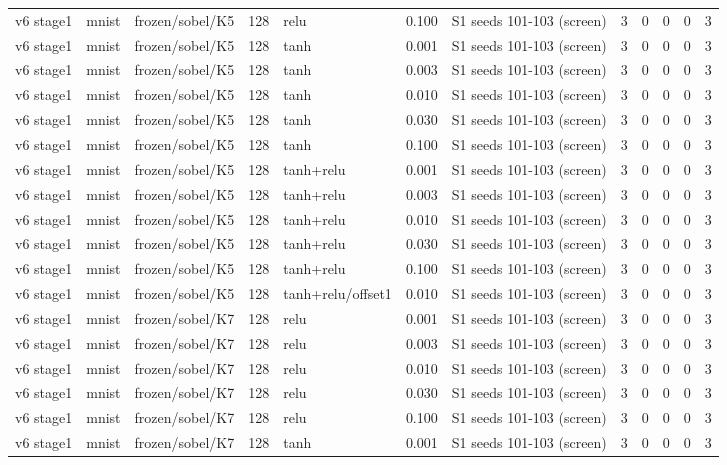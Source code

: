 \begin{table}[htbp]
{\begin{tabular}{@{}lllrlrlrrrrr@{}}
v6 stage1 & mnist & frozen/sobel/K5 & 128 & relu & 0.100 & S1 seeds 101-103 (screen) & 3 & 0 & 0 & 0 & 3 \\
v6 stage1 & mnist & frozen/sobel/K5 & 128 & tanh & 0.001 & S1 seeds 101-103 (screen) & 3 & 0 & 0 & 0 & 3 \\
v6 stage1 & mnist & frozen/sobel/K5 & 128 & tanh & 0.003 & S1 seeds 101-103 (screen) & 3 & 0 & 0 & 0 & 3 \\
v6 stage1 & mnist & frozen/sobel/K5 & 128 & tanh & 0.010 & S1 seeds 101-103 (screen) & 3 & 0 & 0 & 0 & 3 \\
v6 stage1 & mnist & frozen/sobel/K5 & 128 & tanh & 0.030 & S1 seeds 101-103 (screen) & 3 & 0 & 0 & 0 & 3 \\
v6 stage1 & mnist & frozen/sobel/K5 & 128 & tanh & 0.100 & S1 seeds 101-103 (screen) & 3 & 0 & 0 & 0 & 3 \\
v6 stage1 & mnist & frozen/sobel/K5 & 128 & tanh+relu & 0.001 & S1 seeds 101-103 (screen) & 3 & 0 & 0 & 0 & 3 \\
v6 stage1 & mnist & frozen/sobel/K5 & 128 & tanh+relu & 0.003 & S1 seeds 101-103 (screen) & 3 & 0 & 0 & 0 & 3 \\
v6 stage1 & mnist & frozen/sobel/K5 & 128 & tanh+relu & 0.010 & S1 seeds 101-103 (screen) & 3 & 0 & 0 & 0 & 3 \\
v6 stage1 & mnist & frozen/sobel/K5 & 128 & tanh+relu & 0.030 & S1 seeds 101-103 (screen) & 3 & 0 & 0 & 0 & 3 \\
v6 stage1 & mnist & frozen/sobel/K5 & 128 & tanh+relu & 0.100 & S1 seeds 101-103 (screen) & 3 & 0 & 0 & 0 & 3 \\
v6 stage1 & mnist & frozen/sobel/K5 & 128 & tanh+relu/offset1 & 0.010 & S1 seeds 101-103 (screen) & 3 & 0 & 0 & 0 & 3 \\
v6 stage1 & mnist & frozen/sobel/K7 & 128 & relu & 0.001 & S1 seeds 101-103 (screen) & 3 & 0 & 0 & 0 & 3 \\
v6 stage1 & mnist & frozen/sobel/K7 & 128 & relu & 0.003 & S1 seeds 101-103 (screen) & 3 & 0 & 0 & 0 & 3 \\
v6 stage1 & mnist & frozen/sobel/K7 & 128 & relu & 0.010 & S1 seeds 101-103 (screen) & 3 & 0 & 0 & 0 & 3 \\
v6 stage1 & mnist & frozen/sobel/K7 & 128 & relu & 0.030 & S1 seeds 101-103 (screen) & 3 & 0 & 0 & 0 & 3 \\
v6 stage1 & mnist & frozen/sobel/K7 & 128 & relu & 0.100 & S1 seeds 101-103 (screen) & 3 & 0 & 0 & 0 & 3 \\
v6 stage1 & mnist & frozen/sobel/K7 & 128 & tanh & 0.001 & S1 seeds 101-103 (screen) & 3 & 0 & 0 & 0 & 3 \\

\end{tabular}}
\end{table}
